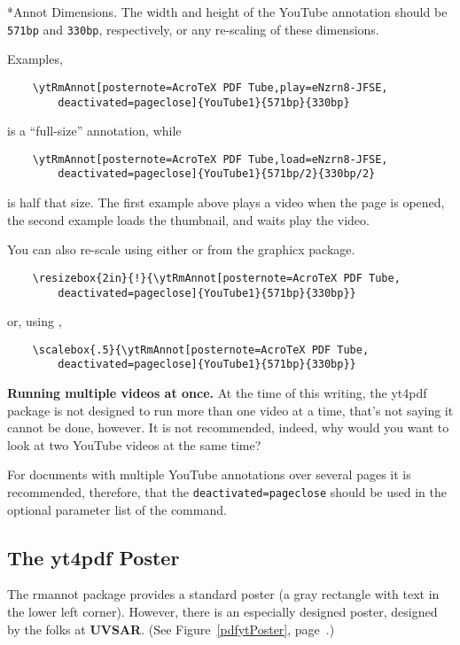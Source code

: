 \documentclass{article}
\makeatletter
\def\pkg{\textsf}
\renewcommand*{\theparagraph}{\texorpdfstring{\protect\P\protect\ }{\textparagraph}}
\renewcommand{\paragraph}
    {\renewcommand{\@seccntformat}[1]{\theparagraph}%
    \@startsection{paragraph}{4}{0pt}{6pt}{-3pt}{\color{\aeb@subsubsectioncolor}\bfseries}}
\newcommand{\YouTube}{\textsf{YouTube}}
\makeatother
\begin{document}
\paragraph*{Annot Dimensions.}
The width and height of the {\YouTube} annotation should be \texttt{571bp}
and \texttt{330bp}, respectively, or any re-scaling of these dimensions.

Examples,
\begin{Verbatim}
    \ytRmAnnot[posternote=AcroTeX PDF Tube,play=eNzrn8-JFSE,
        deactivated=pageclose]{YouTube1}{571bp}{330bp}
\end{Verbatim}
is a ``full-size'' annotation, while
\begin{Verbatim}
    \ytRmAnnot[posternote=AcroTeX PDF Tube,load=eNzrn8-JFSE,
        deactivated=pageclose]{YouTube1}{571bp/2}{330bp/2}
\end{Verbatim}
is half that size. The first example above plays a video when
the page is opened, the second example loads the thumbnail, and waits play
the video.

You can also re-scale using either  or
 from the \textsf{graphicx} package.
\begin{Verbatim}
    \resizebox{2in}{!}{\ytRmAnnot[posternote=AcroTeX PDF Tube,
        deactivated=pageclose]{YouTube1}{571bp}{330bp}}
\end{Verbatim}
or, using ,
\begin{Verbatim}
    \scalebox{.5}{\ytRmAnnot[posternote=AcroTeX PDF Tube,
        deactivated=pageclose]{YouTube1}{571bp}{330bp}}
\end{Verbatim}

\textbf{Running multiple videos at once.} At the time of this writing, the
\pkg{yt4pdf} package is not designed to run more than one video at a
time, that's not saying it cannot be done, however. It is not recommended,
indeed, why would you want to look at two {\YouTube} videos at the same
time?

For documents with multiple {\YouTube} annotations over
several pages it is recommended, therefore, that the \texttt{deactivated=pageclose}
should be used in the optional parameter list of the 
command.

\subsection{The \texorpdfstring{\protect\textsf{yt4pdf}}{yt4pdf} Poster}

The \textsf{rmannot} package provides a standard poster (a gray rectangle
with text in the lower left corner). However, there is an especially
designed poster, designed by the folks at \textbf{UVSAR}. (See
Figure~\ref*{pdfytPoster}, page~\pageref*{pdfytPoster}.)
\end{document}
